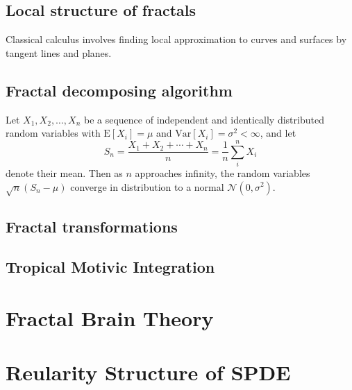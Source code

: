 \documentclass[a4paper]{article}
\begin{document}
\subsection{Local structure of fractals}
Classical calculus involves finding local approximation to curves and surfaces by tangent lines and planes.

\subsection{Fractal decomposing algorithm}

Let $X_1, X_2, \ldots, X_n$ be a sequence of independent and identically distributed random variables with $\text{E}[X_i] = \mu$ and $\text{Var}[X_i] = \sigma^2 < \infty$, and let
\[S_n = \frac{X_1 + X_2 + \cdots + X_n}{n}
      = \frac{1}{n}\sum_{i}^{n} X_i\]
denote their mean. Then as $n$ approaches infinity, the random variables $\sqrt{n}(S_n - \mu)$ converge in distribution to a normal $\mathcal{N}(0, \sigma^2)$.

\subsection{Fractal transformations}
\subsection{Tropical Motivic Integration}

\section{Fractal Brain Theory}
\section{Reularity Structure of SPDE}




\end{document}
